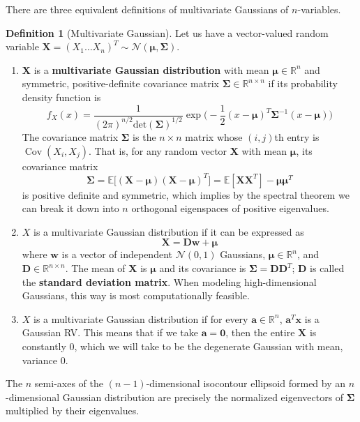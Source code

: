 \documentclass{article}
\DeclareMathOperator{\Cov}{Cov}
\theoremstyle{definition}
\theoremstyle{remark}
\theoremstyle{definition}
\newtheorem{definition}{Definition}[section]
\begin{document}
There are three equivalent definitions of multivariate Gaussians of $n$-variables. 

\begin{definition}[Multivariate Gaussian]
Let us have a vector-valued random variable $\mathbf{X} = (X_1 \ldots X_n)^T \sim \mathcal{N}(\boldsymbol{\mu}, \boldsymbol{\Sigma})$. 
\begin{enumerate}
    \item $\mathbf{X}$ is a \textbf{multivariate Gaussian distribution} with mean $\boldsymbol{\mu} \in \mathbb{R}^n$ and symmetric, positive-definite covariance matrix $\boldsymbol{\Sigma} \in \mathbb{R}^{n \times n}$ if its probability density function is
    \[f_X (x) = \frac{1}{(2\pi)^{n/2} \mathrm{det}(\boldsymbol{\Sigma})^{1/2}} \exp\bigg( -\frac{1}{2} (x-\boldsymbol{\mu})^T \boldsymbol{\Sigma}^{-1} (x - \boldsymbol{\mu})\bigg)\]
    The covariance matrix $\boldsymbol{\Sigma}$ is the $n \times n$ matrix whose $(i, j)$th entry is $\Cov(X_i, X_j)$. That is, for any random vector $\mathbf{X}$ with mean $\boldsymbol{\mu}$, its covariance matrix 
    \[\boldsymbol{\Sigma} = \mathbb{E}\big[ (\mathbf{X} - \boldsymbol{\mu}) (\mathbf{X} - \boldsymbol{\mu})^T \big] = \mathbb{E}[\mathbf{X} \mathbf{X}^T] - \boldsymbol{\mu} \boldsymbol{\mu}^T\]
    is positive definite and symmetric, which implies by the spectral theorem we can break it down into $n$ orthogonal eigenspaces of positive eigenvalues. 

    \item $X$ is a multivariate Gaussian distribution if it can be expressed as 
    \[\mathbf{X} = \mathbf{D} \mathbf{w} + \boldsymbol{\mu}\]
    where $\mathbf{w}$ is a vector of independent $\mathcal{N}(0, 1)$ Gaussians, $\boldsymbol{\mu} \in \mathbb{R}^n$, and $\mathbf{D} \in \mathbb{R}^{n \times n}$. The mean of $\mathbf{X}$ is $\boldsymbol{\mu}$ and its covariance is $\boldsymbol{\Sigma} = \mathbf{D} \mathbf{D}^T$; $\mathbf{D}$ is called the \textbf{standard deviation matrix}. When modeling high-dimensional Gaussians, this way is most computationally feasible. 

    \item $X$ is a multivariate Gaussian distribution if for every $\mathbf{a} \in \mathbb{R}^n$, $\mathbf{a}^T \mathbf{x}$ is a Gaussian RV. This means that if we take $\mathbf{a} = \mathbf{0}$, then the entire $\mathbf{X}$ is constantly $0$, which we will take to be the degenerate Gaussian with mean, variance $0$. 
\end{enumerate}
The $n$ semi-axes of the $(n-1)$-dimensional isocontour ellipsoid formed by an $n$-dimensional Gaussian distribution are precisely the normalized eigenvectors of $\boldsymbol{\Sigma}$ multiplied by their eigenvalues. 
\end{definition}
\end{document}

